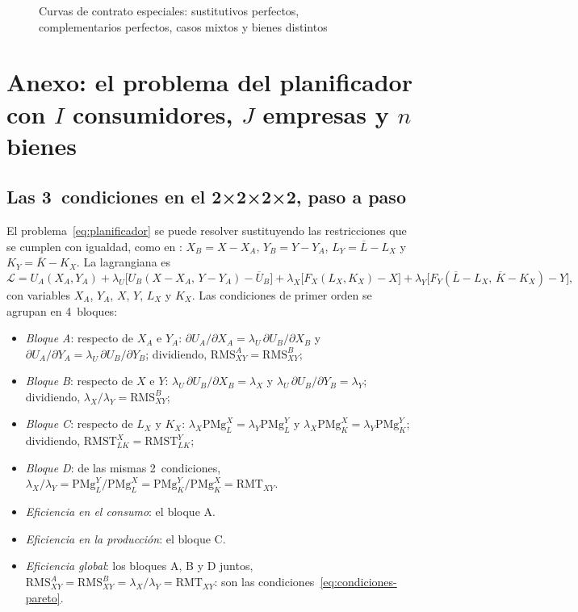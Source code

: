 \documentclass[11pt]{article}
\begin{document}
\begin{figure}[H]
\centering
\caption{Curvas de contrato especiales: sustitutivos perfectos, complementarios perfectos, casos mixtos y bienes distintos}\label{fig:curvas-contrato-especiales}
\end{figure}

\section{Anexo: el problema del planificador\cortetitulo{} con $I$ consumidores, $J$ empresas y $n$ bienes}\label{anexo:planificador-general}

\subsection{Las 3~condiciones en el 2×2×2×2, paso a paso}\label{anexo:planificador-pasos}

El problema~\eqref{eq:planificador} se puede resolver sustituyendo las restricciones que se cumplen con igualdad, como en \textcite{MatePerez2007Microeconomia}: $X_B=X-X_A$, $Y_B=Y-Y_A$, $L_Y=\overline{L}-L_X$ y $K_Y=\overline{K}-K_X$. La lagrangiana es
$$\mathcal{L}=U_A(X_A,Y_A)+\lambda_U\big[U_B(X-X_A,\,Y-Y_A)-\overline{U}_B\big]+\lambda_X\big[F_X(L_X,K_X)-X\big]+\lambda_Y\big[F_Y(\overline{L}-L_X,\,\overline{K}-K_X)-Y\big],$$
con variables $X_A$, $Y_A$, $X$, $Y$, $L_X$ y $K_X$. Las condiciones de primer orden se agrupan en 4~bloques:
\begin{itemize}
\item \emph{Bloque A}: respecto de $X_A$ e $Y_A$: $\partial U_A/\partial X_A=\lambda_U\,\partial U_B/\partial X_B$ y $\partial U_A/\partial Y_A=\lambda_U\,\partial U_B/\partial Y_B$; dividiendo, $\mathrm{RMS}^A_{XY}=\mathrm{RMS}^B_{XY}$;
\item \emph{Bloque B}: respecto de $X$ e $Y$: $\lambda_U\,\partial U_B/\partial X_B=\lambda_X$ y $\lambda_U\,\partial U_B/\partial Y_B=\lambda_Y$; dividiendo, $\lambda_X/\lambda_Y=\mathrm{RMS}^B_{XY}$;
\item \emph{Bloque C}: respecto de $L_X$ y $K_X$: $\lambda_X\mathrm{PMg}^X_L=\lambda_Y\mathrm{PMg}^Y_L$ y $\lambda_X\mathrm{PMg}^X_K=\lambda_Y\mathrm{PMg}^Y_K$; dividiendo, $\mathrm{RMST}^X_{LK}=\mathrm{RMST}^Y_{LK}$;
\item \emph{Bloque D}: de las mismas 2~condiciones, $\lambda_X/\lambda_Y=\mathrm{PMg}^Y_L/\mathrm{PMg}^X_L=\mathrm{PMg}^Y_K/\mathrm{PMg}^X_K=\mathrm{RMT}_{XY}$.
\end{itemize}
\begin{itemize}
\item \emph{Eficiencia en el consumo}: el bloque A.
\item \emph{Eficiencia en la producción}: el bloque C.
\item \emph{Eficiencia global}: los bloques A, B y D juntos, $\mathrm{RMS}^A_{XY}=\mathrm{RMS}^B_{XY}=\lambda_X/\lambda_Y=\mathrm{RMT}_{XY}$: son las condiciones~\eqref{eq:condiciones-pareto}.
\end{itemize}
\end{document}
